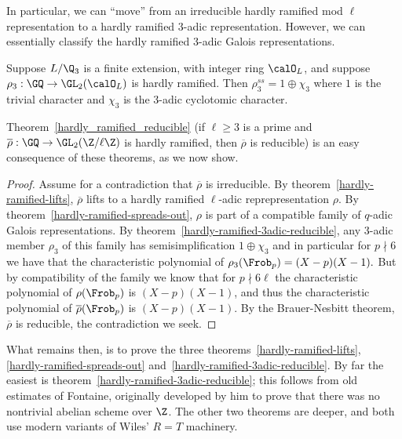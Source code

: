In particular, we can ``move'' from an irreducible hardly ramified mod $\ell$ representation
to a hardly ramified 3-adic representation.
However, we can essentially classify the hardly ramified 3-adic Galois representations.

\begin{theorem}
  \label{hardly-ramified-3adic-reducible}
  Suppose $L/\Q_3$ is a finite extension, with integer ring $\calO_L$, and suppose
  $\rho_3:\GQ\to\GL_2(\calO_L)$ is hardly ramified. Then $\rho_3^{ss}=1\oplus\chi_3$
  where $1$ is the trivial character and $\chi_3$ is the 3-adic cyclotomic character.
\end{theorem}

Theorem~\ref{hardly_ramified_reducible} (if $\ell\geq 3$ is a prime and
$\overline{\rho}:\GQ\to\GL_2(\Z/\ell\Z)$ is hardly ramified,
then $\overline{\rho}$ is reducible) is an easy consequence of these theorems,
as we now show.

\begin{proof}
  Assume for a contradiction that $\overline{\rho}$ is irreducible. By theorem~\ref{hardly-ramified-lifts},
  $\overline{\rho}$ lifts to a hardly ramified $\ell$-adic reprepresentation $\rho$. By
  theorem~\ref{hardly-ramified-spreads-out}, $\rho$ is part of a compatible family of
  $q$-adic Galois representations. By theorem~\ref{hardly-ramified-3adic-reducible},
  any 3-adic member $\rho_3$ of this family has semisimplification $1\oplus\chi_3$ and in particular
  for $p\nmid 6$ we have that the characteristic polynomial of $\rho_3(\Frob_p)=(X-p)(X-1).$
  But by compatibility of the family we know that for $p\nmid 6\ell$ the characteristic
  polynomial of $\rho(\Frob_p)$ is $(X-p)(X-1)$, and thus the characteristic polynomial
  of $\overline{\rho}(\Frob_p)$ is $(X-p)(X-1)$. By the Brauer-Nesbitt theorem, $\overline{\rho}$
  is reducible, the contradiction we seek.
\end{proof}

What remains then, is to prove the three theorems~\ref{hardly-ramified-lifts},
\ref{hardly-ramified-spreads-out} and~\ref{hardly-ramified-3adic-reducible}.
By far the easiest is theorem~\ref{hardly-ramified-3adic-reducible}; this follows
from old estimates of Fontaine, originally developed by him to prove that there was no
nontrivial abelian scheme over $\Z$. The other two theorems are deeper, and both use
modern variants of Wiles' $R=T$ machinery.
